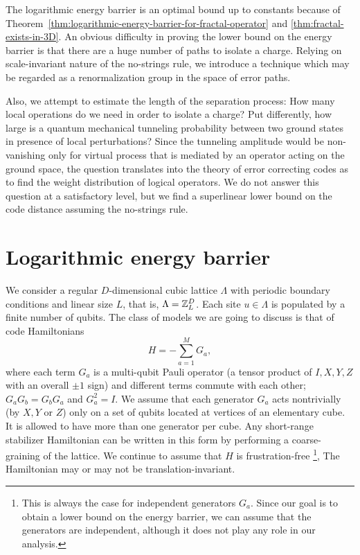 The logarithmic energy barrier is an optimal bound up to constants
because of Theorem~\ref{thm:logarithmic-energy-barrier-for-fractal-operator}
and \ref{thm:fractal-exists-in-3D}.
An obvious difficulty in proving the lower bound on the energy barrier
is that there are a huge number of paths to isolate a charge.
Relying on scale-invariant nature of the no-strings rule,
we introduce a technique which may be regarded
as a renormalization group in the space of error paths.


Also, we attempt to estimate the length of the separation process:
How many local operations do we need in order to isolate a charge?
Put differently,
how large is a quantum mechanical tunneling probability between two ground states
in presence of local perturbations?
Since the tunneling amplitude would be non-vanishing only for
virtual process that is mediated by an operator acting on the ground space,
the question translates into the theory of error correcting codes
as to find the weight distribution of logical operators.
We do not answer this question at a satisfactory level,
but we find a superlinear lower bound on the code distance assuming the no-strings rule.


\section{Logarithmic energy barrier}
\label{sec:log-barrier}

We consider a regular $D$-dimensional cubic lattice $\Lambda$
with periodic boundary conditions and linear size $L$, that is, $\Lambda=\mathbb{Z}_L^D$.
Each site $u\in \Lambda$ is populated by a finite number of qubits.
The class of models we are going to discuss is that of code Hamiltonians
\begin{equation}
H=-\sum_{a=1}^{M} G_a,
\label{eq:stabH}
\end{equation}
where each term $G_a$  is a multi-qubit Pauli operator 
(a tensor product of $I,X,Y,Z$ with an overall $\pm 1$ sign)
and different terms commute with each other;
$G_a G_b =G_b G_a$ and $G_a^2=I$.
We assume that each generator $G_a$ acts nontrivially (by $X,Y$ or $Z$)
only on a set of qubits located at vertices of an elementary cube.
It is allowed to have more than one generator per cube.
Any short-range stabilizer Hamiltonian can be written in this form by performing
a coarse-graining of the lattice.
We continue to assume that $H$ is frustration-free%
\footnote{This is always the case for independent generators $G_a$. 
Since our goal is to obtain a lower bound on the
energy barrier, we can assume that the generators are independent, although it does not
play any role in our analysis.},
The Hamiltonian may or may not be translation-invariant.

